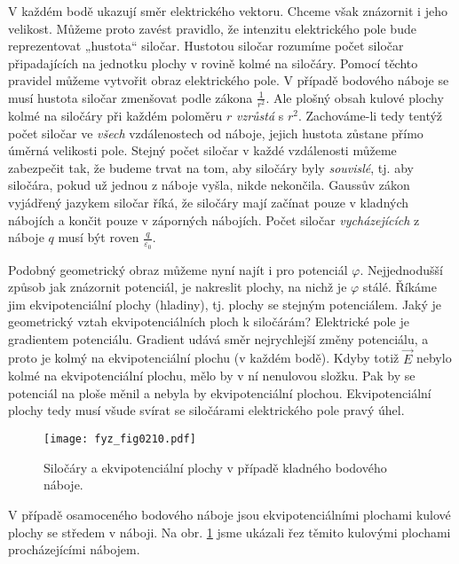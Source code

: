     V každém bodě ukazují směr elektrického vektoru. Chceme však znázornit i jeho velikost. Můžeme 
    proto zavést pravidlo, že intenzitu elektrického pole bude reprezentovat „hustota“ siločar. 
    Hustotou siločar rozumíme počet siločar připadajících na jednotku plochy v rovině kolmé na 
    siločáry. Pomocí těchto pravidel můžeme vytvořit obraz elektrického pole. V případě bodového 
    náboje se musí hustota siločar zmenšovat podle zákona \(\frac{1}{r^2}\). Ale plošný obsah 
    kulové plochy kolmé na siločáry při každém poloměru \(r\) \emph{vzrůstá} s \(r^2\). 
    Zachováme-li tedy tentýž počet siločar ve \emph{všech} vzdálenostech od náboje, jejich hustota 
    zůstane přímo úměrná velikosti pole. Stejný počet siločar v každé vzdálenosti můžeme zabezpečit 
    tak, že budeme trvat na tom, aby siločáry byly \emph{souvislé}, tj. aby siločára, pokud už 
    jednou z náboje vyšla, nikde nekončila. Gaussův zákon vyjádřený jazykem siločar říká, že 
    siločáry mají začínat pouze v kladných nábojích a končit pouze v záporných nábojích. Počet 
    siločar \emph{vycházejících} z náboje \(q\) musí být roven \(\frac{q}{\varepsilon_0}\).
    
    Podobný geometrický obraz můžeme nyní najít i pro potenciál \(\varphi\). Nejjednodušší způsob 
    jak znázornit potenciál, je nakreslit plochy, na nichž je \(\varphi\) stálé. Říkáme jim 
    ekvipotenciální plochy (hladiny), tj. plochy se stejným potenciálem. Jaký je geometrický vztah 
    ekvipotenciálních ploch k siločárám? Elektrické pole je gradientem potenciálu. Gradient udává 
    směr nejrychlejší změny potenciálu, a proto je kolmý na ekvipotenciální plochu (v každém bodě). 
    Kdyby totiž \(\vec{E}\) nebylo kolmé na ekvipotenciální plochu, mělo by v ní nenulovou složku. 
    Pak by se potenciál na ploše měnil a nebyla by ekvipotenciální plochou. Ekvipotenciální plochy 
    tedy musí všude svírat se siločárami elektrického pole pravý úhel.    
    \begin{figure}[ht!]
      \centering
      \texttt{[image: fyz\_fig0210.pdf]}
      \caption{Siločáry a ekvipotenciální plochy v případě kladného bodového náboje.}
      \label{fyz:fig0210}
    \end{figure}
    
    V případě osamoceného bodového náboje jsou ekvipotenciálními plochami kulové plochy se středem 
    v náboji. Na obr. \ref{fyz:fig0210} jsme ukázali řez těmito kulovými plochami 
    procházejícími nábojem.
    
